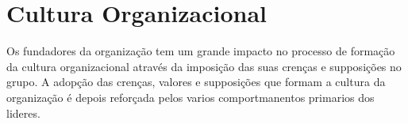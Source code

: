 \newpage
\section{Cultura Organizacional}

Os fundadores da organização tem um grande impacto no processo de formação da cultura organizacional através da imposição das suas crenças e supposições no grupo. A adopção das crenças, valores e supposições que formam a cultura da organização é depois reforçada pelos varios comportmanentos primarios dos lideres.

